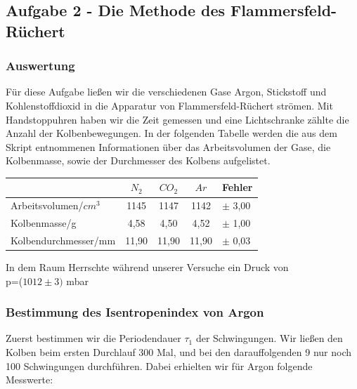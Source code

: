 \documentclass{article}
\begin{document}
{{\vspace{1 cm}
\subsection{Aufgabe 2 - Die Methode des Flammersfeld-Rüchert}
\subsubsection{Auswertung}
Für diese Aufgabe ließen wir die verschiedenen Gase Argon, Stickstoff und Kohlenstoffdioxid in die Apparatur von Flammersfeld-Rüchert strömen. Mit Handstoppuhren haben wir die Zeit gemessen und eine Lichtschranke zählte die Anzahl der Kolbenbewegungen. In der folgenden Tabelle werden die aus dem Skript entnommenen Informationen über das Arbeitsvolumen der Gase, die Kolbenmasse, sowie der Durchmesser des Kolbens aufgelistet.

\begin{center}
\begin{tabular}{l|c|c|c|l}
& {$N_2$} & {$CO_2$}& {$Ar$}& {Fehler}\\
\hline 
Arbeitsvolumen/\(cm^3\)  & 1145 & 1147 & 1142 & \(\pm\) 3,00 \\ 
Kolbenmasse/g  & 4,58 & 4,50 & 4,52 & \(\pm\) 1,00\\ 
Kolbendurchmesser/mm & 11,90 & 11,90 & 11,90 & \(\pm\) 0,03\\
\end{tabular}
\end{center}

\newpage
In dem Raum Herrschte während unserer Versuche ein Druck von\\ p=(\(1012\pm 3)\) mbar

\subsubsection{Bestimmung des Isentropenindex von Argon}
Zuerst bestimmen wir die Periodendauer \(\tau_{1}\) der Schwingungen. Wir ließen den Kolben beim ersten Durchlauf 300 Mal, und bei den darauffolgenden 9 nur noch 100 Schwingungen 
durchführen. Dabei erhielten wir für Argon folgende Messwerte:

}}
\end{document}
